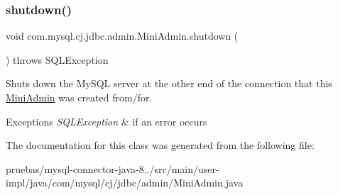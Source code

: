 \subsubsection{\texorpdfstring{shutdown()}{shutdown()}}
{\footnotesize\ttfamily void com.\+mysql.\+cj.\+jdbc.\+admin.\+Mini\+Admin.\+shutdown (\begin{DoxyParamCaption}{ }\end{DoxyParamCaption}) throws S\+Q\+L\+Exception}

Shuts down the My\+S\+QL server at the other end of the connection that this \mbox{\hyperlink{classcom_1_1mysql_1_1cj_1_1jdbc_1_1admin_1_1_mini_admin}{Mini\+Admin}} was created from/for.


\begin{DoxyExceptions}{Exceptions}
{\em S\+Q\+L\+Exception} & if an error occurs \\
\hline
\end{DoxyExceptions}


The documentation for this class was generated from the following file\+:\begin{DoxyCompactItemize}
\item 
pruebas/mysql-\/connector-\/java-\/8../src/main/user-\/impl/java/com/mysql/cj/jdbc/admin/Mini\+Admin.\+java\end{DoxyCompactItemize}
